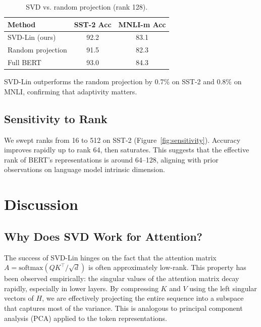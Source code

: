 \documentclass[twocolumn]{article}
\begin{document}
\begin{table}[h]
\centering
\caption{SVD vs. random projection (rank 128).}
\label{tab:ablation}
\begin{tabular}{lcc}
\toprule
\textbf{Method} & \textbf{SST-2 Acc} & \textbf{MNLI-m Acc} \\
\midrule
SVD-Lin (ours) & 92.2 & 83.1 \\
Random projection & 91.5 & 82.3 \\
Full BERT & 93.0 & 84.3 \\
\bottomrule
\end{tabular}
\end{table}

SVD-Lin outperforms the random projection by 0.7\% on SST-2 and 0.8\% on MNLI, confirming that adaptivity matters.

\subsection{Sensitivity to Rank}
We swept ranks from 16 to 512 on SST-2 (Figure~\ref{fig:sensitivity}). Accuracy improves rapidly up to rank 64, then saturates. This suggests that the effective rank of BERT's representations is around 64–128, aligning with prior observations on language model intrinsic dimension.


\section{Discussion}
\subsection{Why Does SVD Work for Attention?}
The success of SVD-Lin hinges on the fact that the attention matrix $A = \text{softmax}(QK^\top/\sqrt{d})$ is often approximately low-rank. This property has been observed empirically: the singular values of the attention matrix decay rapidly, especially in lower layers. By compressing $K$ and $V$ using the left singular vectors of $H$, we are effectively projecting the entire sequence into a subspace that captures most of the variance. This is analogous to principal component analysis (PCA) applied to the token representations.
\end{document}
